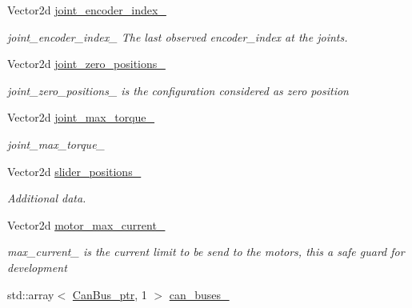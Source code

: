 \begin{DoxyCompactItemize}
Vector2d \hyperlink{classblmc__robots_1_1SingleLeg_a7b56a40d83103f77cd01915c6ee29367}{joint\+\_\+encoder\+\_\+index\+\_\+}
\begin{DoxyCompactList}\small\item\em joint\+\_\+encoder\+\_\+index\+\_\+ The last observed encoder\+\_\+index at the joints. \end{DoxyCompactList}\item 
\mbox{\label{classblmc__robots_1_1SingleLeg_a757c6d5527c7914bdb30b8ee96a8df8d}} 
Vector2d \hyperlink{classblmc__robots_1_1SingleLeg_a757c6d5527c7914bdb30b8ee96a8df8d}{joint\+\_\+zero\+\_\+positions\+\_\+}
\begin{DoxyCompactList}\small\item\em joint\+\_\+zero\+\_\+positions\+\_\+ is the configuration considered as zero position \end{DoxyCompactList}\item 
\mbox{\label{classblmc__robots_1_1SingleLeg_afb76b1c90cce0d805aa4baaa9b4de797}} 
Vector2d \hyperlink{classblmc__robots_1_1SingleLeg_afb76b1c90cce0d805aa4baaa9b4de797}{joint\+\_\+max\+\_\+torque\+\_\+}
\begin{DoxyCompactList}\small\item\em joint\+\_\+max\+\_\+torque\+\_\+ \end{DoxyCompactList}\item 
Vector2d \hyperlink{classblmc__robots_1_1SingleLeg_af841dc84f18c70c85bb0e19dd88da85f}{slider\+\_\+positions\+\_\+}
\begin{DoxyCompactList}\small\item\em Additional data. \end{DoxyCompactList}\item 
\mbox{\label{classblmc__robots_1_1SingleLeg_a4f8e64b30e001d4b1c74595841c26735}} 
Vector2d \hyperlink{classblmc__robots_1_1SingleLeg_a4f8e64b30e001d4b1c74595841c26735}{motor\+\_\+max\+\_\+current\+\_\+}
\begin{DoxyCompactList}\small\item\em max\+\_\+current\+\_\+ is the current limit to be send to the motors, this a safe guard for development \end{DoxyCompactList}\item 
std\+::array$<$ \hyperlink{common__header_8hpp_a793c8789a7598e8aaf766939da7262af}{Can\+Bus\+\_\+ptr}, 1 $>$ \hyperlink{classblmc__robots_1_1SingleLeg_a021418412c79cfa868bfffec24155ef8}{can\+\_\+buses\+\_\+}

\end{DoxyCompactItemize}
